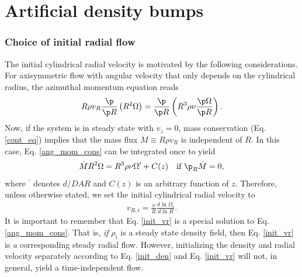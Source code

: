 \section{Artificial density bumps}\label{density_bump}




\subsubsection{Choice of initial radial flow}
The initial cylindrical radial velocity is motivated by the following
considerations. For axisymmetric flow with angular velocity that only
depends on the cylindrical radius, the azimuthal momentum equation reads
\begin{align}\label{ang_mom_cons}
  R\rho v_R\frac{\p}{\p R}\left(R^2\Omega \right) = \frac{\p}{\p
    R}\left(R^3\rho\nu\frac{\p\Omega}{\p R}\right). 
\end{align}
Now, if the system is in steady state with $v_z=0$, mass
conservation (Eq. \ref{cont_eq}) implies that the mass flux  
$\dot{M}\equiv R\rho v_R$ is independent of $R$. In this case,
Eq. \ref{ang_mom_cons} can 
be integrated once to yield 
\begin{align*}
  \dot{M}R^2\Omega = R^3\rho\nu\Omega^\prime + C(z) \quad \text{if $\p_R\dot{M}$} = 0, 
\end{align*}
where $^\prime$ denotes $d/DAR$ and $C(z)$ is an arbitrary function of
$z$. Therefore, unless otherwise stated, we set the initial
cylindrical radial velocity to  
\begin{align}\label{init_vr} 
  v_{R,i} = \frac{\nu}{R}\frac{d\ln{\Omega_i}}{d\ln{R}}. 
\end{align}
It is important to remember that Eq. \ref{init_vr} is a special
solution to Eq. \ref{ang_mom_cons}. That is, \emph{if} $\rho_i$ is a
steady state density field, then Eq. \ref{init_vr} is \emph{a} corresponding
steady radial flow. However, initializing the density and radial velocity
separately according to Eq. \ref{init_den} and Eq. \ref{init_vr} 
will not, in general, yield a time-independent flow. 


